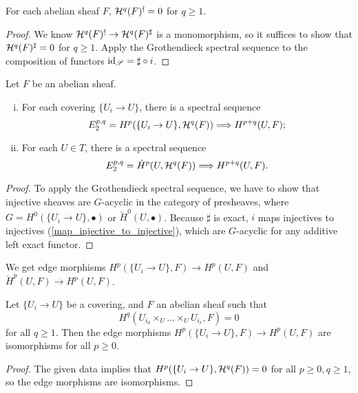 \documentclass[11pt]{amsart}
\begin{document}
\begin{prop}
\label{sheafification_vanish}
    For each abelian sheaf $F$, $\mathcal{H}^q(F)^{\nmid} = 0$ for $q\ge 1$.
\end{prop}

\begin{proof}
    We know $\mathcal{H}^q(F)^{\nmid} \to \mathcal{H}^q(F)^\sharp$ is a monomorphism, so it suffices to show that $\mathcal{H}^q(F)^\sharp = 0$ for $q\ge 1$. Apply the Grothendieck spectral sequence to the composition of functors $\operatorname{id}_{\mathscr{S}} = \sharp \circ i$.
\end{proof}


\begin{thm}
Let $F$ be an abelian sheaf.
    \begin{enumerate}[(i)]
        \item For each covering $\{U_i\to U\}$, there is a spectral sequence
        \[E_2^{p,q} = H^p(\{U_i\to U\}, \mathcal{H}^q(F)) \Longrightarrow H^{p+q}(U, F);\]
        \item For each $U\in T$, there is a spectral sequence
        \[E_2^{p,q} = \check{H}^p(U, \mathcal{H}^q(F)) \Longrightarrow H^{p+q}(U, F).\]
    \end{enumerate}
\end{thm}

\begin{proof}
    To apply the Grothendieck spectral sequence, we have to show that injective sheaves are $G$-acyclic in the category of presheaves, where $G = H^0(\{U_i\to U\},\bullet)$ or $\check{H}^0(U,\bullet)$. Because $\sharp$ is exact, $i$ maps injectives to injectives (\ref{map_injective_to_injective}), which are $G$-acyclic for any additive left exact functor. 
\end{proof}


We get edge morphisms $H^p(\{U_i\to U\}, F)\to H^p(U, F)$ and $\check{H}^p(U,F)\to H^p(U,F)$.

\begin{cor}
\label{edge_morphism_is_iso}
    Let $\{U_i\to U\}$ be a covering, and $F$ an abelian sheaf such that 
    \[H^q(U_{i_0}\times_U \dots \times_U U_{i_r}, F) = 0\]
    for all $q\ge 1$. Then the edge morphisms $H^p(\{U_i\to U\}, F)\to H^p(U, F)$ are isomorphisms for all $p\ge 0$.
\end{cor}

\begin{proof}
    The given data implies that $H^p(\{U_i\to U\}, \mathcal{H}^q(F)) = 0$ for all $p\ge 0, q\ge 1$, so the edge morphisms are isomorphisms.
\end{proof}
\end{document}

